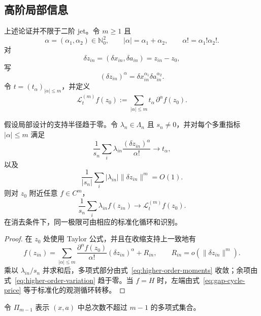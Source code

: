 \subsection{高阶局部信息}
\label{sec:higher-order}

上述论证并不限于二阶 jet。令 $m\ge1$ 且
\[
\alpha=(\alpha_1,\alpha_2)\in\mathbb N_0^2,
\qquad
|\alpha|=\alpha_1+\alpha_2,
\qquad
\alpha!=\alpha_1!\alpha_2!.
\]
对
\[
\delta z_{in}
=
(\delta x_{in},\delta a_{in})
=
z_{in}-z_0,
\]
写
\[
(\delta z_{in})^\alpha
=
\delta x_{in}^{\alpha_1}
\delta a_{in}^{\alpha_2}.
\]
令 $t=(t_\alpha)_{|\alpha|\le m}$，并定义
\begin{equation}
\mathcal L_t^{(m)}f(z_0)
:=
\sum_{|\alpha|\le m}
t_\alpha\,\partial^\alpha f(z_0).
\label{eq:higher-order-functional}
\end{equation}

\begin{theorem}[高阶有限差分]
\label{thm:higher-order-differences}
假设局部设计的支持半径趋于零。令 $\lambda_n\in\Lambda_n$ 且 $s_n\ne0$，并对每个多重指标 $|\alpha|\le m$ 满足
\begin{equation}
\frac1{s_n}
\sum_i
\lambda_{in}
\frac{(\delta z_{in})^\alpha}{\alpha!}
\longrightarrow
t_\alpha,
\label{eq:higher-order-moments}
\end{equation}
以及
\begin{equation}
\frac1{|s_n|}
\sum_i
|\lambda_{in}|
\|\delta z_{in}\|^m
=
O(1).
\label{eq:higher-order-variation}
\end{equation}
则对 $z_0$ 附近任意 $f\in C^m$，
\begin{equation}
\boxed{
\frac1{s_n}\sum_i\lambda_{in}f(z_{in})
\longrightarrow
\mathcal L_t^{(m)}f(z_0).}
\label{eq:higher-order-limit}
\end{equation}
在消去条件下，同一极限可由相应的标准化循环和识别。
\end{theorem}

\begin{proof}
在 $z_0$ 处使用 Taylor 公式，并且在收缩支持上一致地有
\[
f(z_{in})
=
\sum_{|\alpha|\le m}
\frac{\partial^\alpha f(z_0)}{\alpha!}
(\delta z_{in})^\alpha
+
R_{in},
\qquad
R_{in}=o(\|\delta z_{in}\|^m).
\]
乘以 $\lambda_{in}/s_n$ 并求和后，多项式部分由式~\eqref{eq:higher-order-moments} 收敛；余项由式~\eqref{eq:higher-order-variation} 趋于零。当 $f=H$ 时，左端由式~\eqref{eq:gap-cycle-price} 等于标准化的观测循环转移。
\end{proof}

令 $\Pi_{m-1}$ 表示 $(x,a)$ 中总次数不超过 $m-1$ 的多项式集合。

